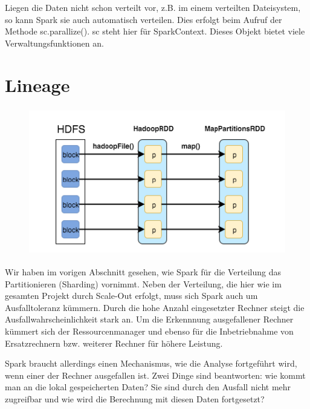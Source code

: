\documentclass[letterpaper]{article}
\begin{document}
Liegen die Daten nicht schon verteilt vor, z.B. im einem verteilten
Dateisystem, so kann Spark sie auch automatisch verteilen. Dies erfolgt
beim Aufruf der Methode sc.parallize(). sc steht hier für SparkContext.
Dieses Objekt bietet viele Verwaltungsfunktionen an. 

\section[Lineage]{\rmfamily Lineage}
\begin{figure}
\centering
\includegraphics[width=11.693cm,height=6.428cm]{bilder/Seminartext-img1.png}
\end{figure}
Wir haben im vorigen Abschnitt gesehen, wie Spark für die Verteilung das
Partitionieren (Sharding) vornimmt. Neben der Verteilung, die hier wie
im gesamten Projekt durch Scale-Out erfolgt, muss sich Spark auch um
Ausfalltoleranz kümmern. Durch die hohe Anzahl eingesetzter Rechner
steigt die Ausfallwahrscheinlichkeit stark an. Um die Erkennnung
ausgefallener Rechner kümmert sich der Ressourcenmanager und ebenso für
die Inbetriebnahme von Ersatzrechnern bzw. weiterer Rechner für höhere
Leistung.

Spark braucht allerdings einen Mechanismus, wie die Analyse fortgeführt
wird, wenn einer der Rechner ausgefallen ist. Zwei Dinge sind
beantworten: wie kommt man an die lokal gespeicherten Daten? Sie sind durch
den Ausfall nicht mehr zugreifbar und wie wird die Berechnung mit
diesen Daten fortgesetzt?
\end{document}
